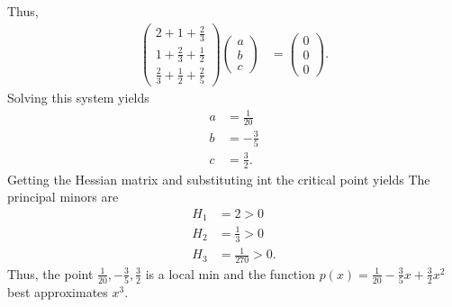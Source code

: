 \documentclass{report}
\begin{document}
\begin{itemize}
            Thus,
            \begin{align*}
                \begin{pmatrix} 2 + 1 + \frac{2}{3} \\ 1 + \frac{2}{3} +\frac{1}{2} \\ \frac{2}{3} + \frac{1}{2} + \frac{2}{5} \end{pmatrix} \begin{pmatrix}a \\ b \\ c \end{pmatrix} &= \begin{pmatrix} 0 \\ 0 \\ 0 \end{pmatrix}
            .\end{align*}
            Solving this system yields
            \begin{align*}
                a&=\frac{1}{20} \\
                 b&= -\frac{3}{5}\\
                 c&= \frac{3}{2}
            .\end{align*}
            \bigbreak \noindent 
            Getting the Hessian matrix and substituting int the critical point yields
            \bigbreak \noindent 
            The principal minors are
            \begin{align*}
                H_{1} &= 2 > 0 \\
                H_{2} &= \frac{1}{3} > 0 \\
               H_{3} &=  \frac{1}{270} > 0
            .\end{align*}
            Thus, the point $\frac{1}{20}, -\frac{3}{5},\frac{3}{2}$ is a local min and the function $p(x) = \frac{1}{20} -\frac{3}{5}x + \frac{3}{2}x^{2}$ best approximates $x^{3}$.
            \bigbreak \noindent 
            \begin{figure}[ht]
                \centering
                \label{fig:showmane}
            \end{figure}


\end{itemize}
\end{document}
